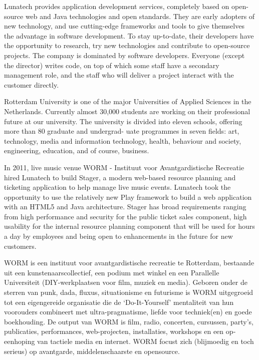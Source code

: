 Lunatech provides application development services, completely based on open-source web and Java technologies and open standards. They are early adopters of new technology, and use cutting-edge frameworks and tools to give themselves the advantage in software development. To stay up-to-date, their developers have the opportunity to research, try new technologies and contribute to open-source projects. The company is dominated by software developers. Everyone (except the director) writes code, on top of which some staff have a secondary management role, and the staff who will deliver a project interact with the customer directly.

Rotterdam University is one of the major Universities of Applied Sciences in the Netherlands. Currently almost 30,000 students are working on their professional future at our university.
The university is divided into eleven schools, offering more than 80 graduate and undergrad- uate programmes in seven fields: art, technology, media and information technology, health, behaviour and society, engineering, education, and of course, business.\cite{HogeschoolRotterdam2012}

In 2011, live music venue WORM - Instituut voor Avantgardistische Recreatie hired Lunatech to build Stager, a modern web-based resource planning and ticketing application to help manage live music events. Lunatech took the opportunity to use the relatively new Play framework to build a web application with an HTML5 and Java architecture. Stager has broad requirements ranging from high performance and security for the public ticket sales component, high usability for the internal resource planning component that will be used for hours a day by employees and being open to enhancements in the future for new customers.

WORM is een instituut voor avantgardistische recreatie te Rotterdam, bestaande uit een kunstenaarscollectief, een podium met winkel en een Parallelle Universiteit (DIY-werkplaatsen 
voor film, muziek en media). Geboren onder de sterren van punk, dada, fluxus, situationisme en futurisme is WORM uitgegroeid tot een eigengereide organisatie die de ‘Do-It-Yourself’ mentaliteit van hun voorouders combineert met ultra-pragmatisme, liefde voor techniek(en) en goede boekhouding. De output van WORM is film, radio, concerten, cursussen, party's, publicaties, performances, web-projecten, installaties, workshops en een op­eenhoping van tactiele media en internet. WORM focust zich (blijmoedig en toch serieus) op avantgarde, middelenschaarste en opensource.


